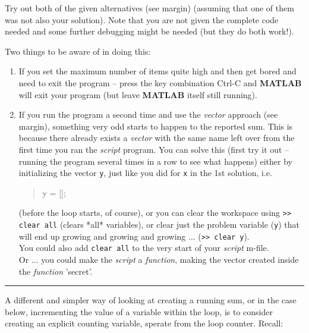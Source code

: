 \documentclass{tufte-book} %
\newenvironment{docspec}{\begin{quotation}\ttfamily\parskip0pt\parindent0pt\ignorespaces}{\end{quotation}}
\begin{document}
Try out  both of the given alternatives (see margin) (assuming that one of them was not also your solution). Note that you are not given the complete code needed and some further debugging might be needed (but they do both work!).

Two things to be aware of in doing this:

\begin{enumerate}[noitemsep]
\setlength{\itemindent}{.2in}
\vspace{1mm}
\item If you set the maximum number of items quite high and then get bored and need to exit the program -- press the key combination \textsf{Ctrl-C} and \textbf{MATLAB} will exit your program (but leave \textbf{MATLAB} itself still running).
\vspace{1mm}
\item If you run the program a second time and use the \textit{vector} approach (see margin), something very odd starts to happen to the reported sum. This is because there already exists a \textit{vector} with the same name left over from the first time you ran the \textit{script} program. You can solve this (first try it out -- running the program several times in a row to see what happens) either by initializing the vector \texttt{y}, just like you did for \texttt{x} in the 1st solution, i.e.
\begin{docspec}
y = [];
\end{docspec}
(before the loop starts, of course), or you can clear the workspace using \texttt{>> clear all} (clears *all* variables), or clear just the problem variable (\texttt{y}) that will end up growing and growing and growing ... (\texttt{>> clear y}).
\\You could also add \texttt{clear all} to the very start of your \textit{script} \textsf{m-file}.
\\Or ... you could make the \textit{script} a \textit{function}, making the vector created inside the \textit{function} 'secret'.
\end{enumerate}

\vspace{-1mm}
\noindent\rule{4cm}{0.5pt}
\vspace{2mm}

\noindent A different and simpler way of looking at creating a running sum, or in the case below, incrementing the value of a variable within the loop, is to consider creating an explicit counting variable, sperate from the loop counter. Recall:
\end{document}
